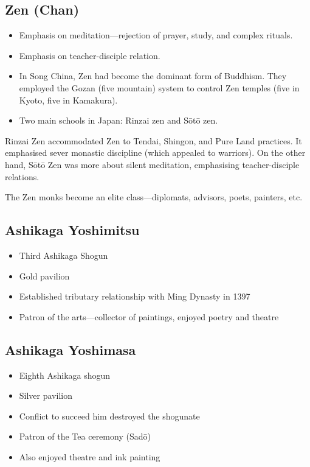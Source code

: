 \documentclass[class=article, crop=false]{standalone}
\begin{document}
  \subsection{Zen (Chan)}
  \begin{itemize}
    \item Emphasis on meditation---rejection of prayer, study, and complex rituals.
    \item Emphasis on teacher-disciple relation.
    \item In Song China, Zen had become the dominant form of Buddhism. They employed the Gozan (five mountain) system to control Zen temples (five in Kyoto, five in Kamakura).
    \item Two main schools in Japan: Rinzai zen and S\=ot\=o zen.
  \end{itemize}
  Rinzai Zen accommodated Zen to Tendai, Shingon, and Pure Land practices. It emphasised sever monastic discipline (which appealed to warriors). On the other hand, S\=ot\=o Zen was more about silent meditation, emphasising teacher-disciple relations. \par
  The Zen monks become an elite class---diplomats, advisors, poets, painters, etc.
  \subsection{Ashikaga Yoshimitsu}
  \begin{itemize}
    \item Third Ashikaga Shogun
    \item Gold pavilion
    \item Established tributary relationship with Ming Dynasty in 1397
    \item Patron of the arts---collector of paintings, enjoyed poetry and theatre
  \end{itemize}
  \subsection{Ashikaga Yoshimasa}
  \begin{itemize}
    \item Eighth Ashikaga shogun
    \item Silver pavilion
    \item Conflict to succeed him destroyed the shogunate
    \item Patron of the Tea ceremony (Sad\=o)
    \item Also enjoyed theatre and ink painting
  \end{itemize}
\end{document}
